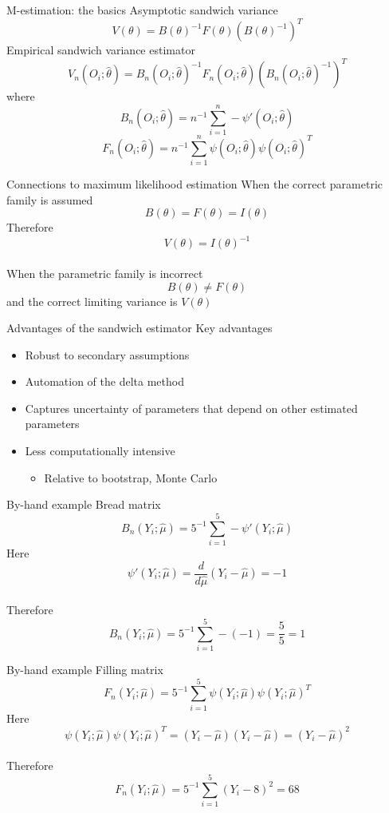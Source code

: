 \documentclass{beamer}
\begin{document}
\begin{frame}{M-estimation: the basics}
	Asymptotic sandwich variance
	\[ V(\theta) = B(\theta)^{-1} F(\theta)\left(B(\theta)^{-1}\right)^T\]
	Empirical sandwich variance estimator
	\[ V_n(O_i; \hat{\theta}) = B_n(O_i; \hat{\theta})^{-1} F_n(O_i; \hat{\theta})
	\left(B_n(O_i; \hat{\theta})^{-1}\right)^T\]
	where
	\[B_n(O_i; \hat{\theta}) = n^{-1} \sum_{i=1}^{n} - \psi'(O_i; \hat{\theta})\]
	\[F_n(O_i; \hat{\theta}) = n^{-1} \sum_{i=1}^{n} \psi(O_i; \hat{\theta}) \psi(O_i; \hat{\theta})^T\]
\end{frame}

\begin{frame}{Connections to maximum likelihood estimation}
	When the correct parametric family is assumed
	\[B(\theta) = F(\theta) = I(\theta)\]
	Therefore
	\[V(\theta) = I(\theta)^{-1}\]
	~\\
	When the parametric family is incorrect
	\[B(\theta) \ne F(\theta)\]
	and the correct limiting variance is $V(\theta)$
\end{frame}

\begin{frame}{Advantages of the sandwich estimator}
	Key advantages
	\begin{itemize}
		\item Robust to secondary assumptions
		\item Automation of the delta method
		\item Captures uncertainty of parameters that depend on other estimated parameters
		\item Less computationally intensive
		\begin{itemize}
			\item Relative to bootstrap, Monte Carlo
		\end{itemize}
	\end{itemize}
\end{frame}

\begin{frame}{By-hand example}
	Bread matrix
	\[B_n(Y_i; \hat{\mu}) = 5^{-1} \sum_{i=1}^{5} - \psi'(Y_i; \hat{\mu})\]
	Here
	\[\psi'(Y_i; \hat{\mu}) = \frac{d}{d\hat{\mu}}\left(Y_i - \hat{\mu}\right) = -1\]
	~\\
	Therefore
	\[B_n(Y_i; \hat{\mu}) = 5^{-1} \sum_{i=1}^{5} -(-1) = \frac{5}{5} = 1\]
\end{frame}

\begin{frame}{By-hand example}
	Filling matrix
	\[F_n(Y_i; \hat{\mu}) = 5^{-1} \sum_{i=1}^{5} \psi(Y_i; \hat{\mu}) \psi(Y_i; \hat{\mu})^T\]
	Here
	\[\psi(Y_i; \hat{\mu}) \psi(Y_i; \hat{\mu})^T = (Y_i - \hat{\mu})(Y_i - \hat{\mu}) = (Y_i - \hat{\mu})^2\]
	~\\
	Therefore
	\[F_n(Y_i; \hat{\mu}) = 5^{-1} \sum_{i=1}^{5} (Y_i - 8)^2 = 68\]
\end{frame}
\end{document}
